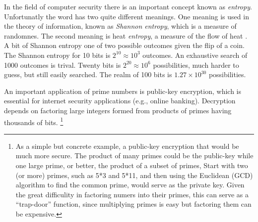 \documentclass{ximera}
\begin{document}

In the field of computer security there is an important concept known as \emph{entropy}.
Unfortunatly the word has two quite different meanings.
One meaning is used in the theory of information, known as \emph{Shannon entropy}, which is a measure of randomnes.
The second meaning is heat \emph{entropy}, a measure of the flow of heat \citep{Allen94a,Allen96f}. 
\label{entropyH} 
\label{entropyS} 
A bit of Shannon entropy one of two possible outcomes given the flip of a coin.
The Shannon entropy for 10 bits is $2^{10} \approx 10^3$ outcomes.
An exhaustive search of 1000 outcomes is trival. 
Twenty bits is $2^{20} \approx 10^6$ possibilities, much harder to guess, but still easily searched.
The realm of 100 bits is $1.27\!\times\! 10^{30}$ possibilities.


An important application of prime numbers is public-key  encryption, which is essential for internet security applications (e.g., online banking). %
Decryption depends on factoring large integers formed from products of primes having thousands of bits.%
 \footnote{\magenta As a simple but concrete example, a public-key encryption that would be much more secure.
The product of many primes could be the public-key while one large prime, or better, the product of a subset of primes,
 Start with two (or more) primes, such as 5*3 and 5*11, and then using the Euclidean (GCD) algorithm
 to find the common prime, would serve as the private key.
Given the great difficulity in factoring numers into their primes, this can serve as a ``trap-door'' function, since multiplying primes is easy but factoring them can be expensive.  }

\end{document}
